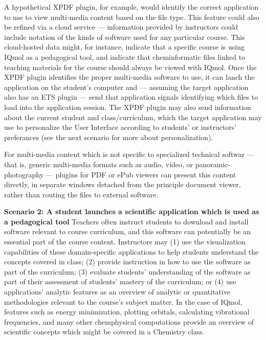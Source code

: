 \documentclass[10pt,letterpaper]{article}
\newcommand{\pseudoIndent}{

\vspace{1pt}\hspace*{38pt}}
\newcommand{\LPF}{\resizebox{!}{8pt}{\AcronymText{LPF}}}
\newcommand{\textscc}[1]{{\color{orr!35!black}{{%
						\fontfamily{Cabin-TLF}\fontseries{b}\selectfont{\textsc{\scriptsize{#1}}}}}}}
\newcommand{\AcronymText}[1]{{\textscc{#1}}}
\newenvironment{mldescription}{%
  \begin{addmargin}[4pt]{1em}
    \setlength{\parindent}{-1em}%
    \newcommand*{\mlitem}[1][]{\par\medskip\textbf{##1}\quad}\indent
}{%
  \end{addmargin}
  \medskip
}
\begin{document}
{{\begin{mldescription}
\pseudoIndent{} A hypothetical XPDF plugin, for example, 
would identify the correct application to use to view 
multi-media content based on the file type.  This feature 
could also be refined via a cloud service --- information 
provided by instructors could include notation of the 
kinds of software used for any particular course.  
This cloud-hosted data might, for instance, indicate 
that a specific course is using IQmol as a pedagogical 
tool, and indicate that cheminformatic files linked 
to teaching materials for the course should always be 
viewed with IQmol.  Once the XPDF plugin identifies 
the proper multi-media software to use, it can 
lanch the application on the student's computer and 
--- assuming the target application also has an ETS 
plugin --- send that application signals identifying 
which files to load into the application session.   
The XPDF plugin may also send 
information about the current student and 
class/curriculum, which the target application may use to 
personalize the User Interface according to students' 
or instructors' preferances (see the next scenario 
for more about personalization).

\pseudoIndent{} For multi-media content which is 
not specific to specialized technical softwar 
--- that is, generic multi-media formats such as 
audio, video, or panoramic-photography --- 
\LPF{} plugins for PDF or ePub viewers can present 
this content directly, in separate windows detached 
from the principle document viewer, rather than 
routing the files to external software.   

\mlitem[Scenario 2: A student launches a scientific 
application which is used as a pedagogical tool]  
Teachers often instruct students to download 
and install software relevant to course curriculum, 
and this software can potentially be an essential 
part of the course content.  Instructors may 
(1) use the visualization capabilities of these 
domain-specific applications to help students 
understand the concepts covered in class; 
(2) provide instruction in how to use the 
software as part of the curriculum; 
(3) evaluate students' understanding of the 
software as part of their assessment of 
students' mastery of the curriculum; or 
(4) use applications' analytic features as an 
overview of analytic or quantitative methodologies 
relevant to the course's subject matter.  In 
the case of IQmol, features such as 
energy minimization, plotting orbitals, 
calculating vibrational frequencies, and many 
other chemphysical computations provide an 
overview of scientific concepts which 
might be covered in a Chemistry class. 
 

\end{mldescription}}}
\end{document}
